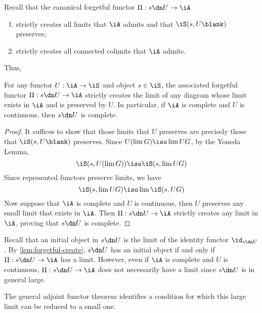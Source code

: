 \documentclass{amsart}
\begin{document}
Recall that the canonical forgetful functor $\Pi : s \dn U \to \iA$
\begin{enumerate}
\item strictly creates all limits that $\iA$ admits and that $\iS(s, U\blank)$ preserves;
\item strictly creates all connected colimits that $\iA$ admits.
\end{enumerate}
Thus,
\begin{lem}\label{lem:forgetful-create}
  For any functor $U : \iA \to \iS$ and object $s \in \iS$, the associated forgetful functor $\Pi : s \dn U \to \iA$ strictly creates the limit of any diagram whose limit exists in $\iA$ and is preserved by $U$.
  In particular, if $\iA$ is complete and $U$ is continuous, then $s \dn U$ is complete.
\end{lem}
\begin{proof}
  It suffices to show that those limits that $U$ preserves are precisely those that $\iS(s,U\blank)$ preserves.
  Since $U(\lim G) \iso \lim UG$, by the Yoneda Lemma,
  \[
    \iS(s, U(\lim G)) \iso \iS(s, \lim UG)
  \]
  Since represented functors preserve limits, we have
  \[
    \iS(s, \lim UG) \iso \lim \iS(s, UG)
  \]
  Now suppose that $\iA$ is complete and $U$ is continuous, then $U$ preserves any small limit that exists in $\iA$.
  Then $\Pi : s \dn U \to \iA$ strictly creates any limit in $\iA$, proving that $s \dn U$ is complete.
\end{proof}

Recall that an initial object in $s \dn U$ is the limit of the identity functor $\id_{s \dn U}$.
By \cref{lem:forgetful-create}, $s \dn U$ has an initial object if and only if $\Pi : s \dn U \to \iA$ has a limit.
However, even if $\iA$ is complete and $U$ is continuous, $\Pi : s \dn U \to \iA$ does not necessarily have a limit since $s \dn U$ is in general large.

The general adjoint functor theorem identifies a condition for which this large limit can be reduced to a small one.
\end{document}
